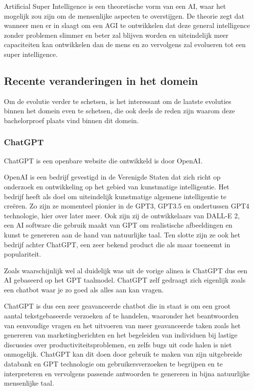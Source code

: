     Artificial Super Intelligence is een theoretische vorm van een AI, waar het mogelijk zou zijn om de mensenlijke aspecten te overstijgen. De theorie zegt dat wanneer men er in slaagt om een AGI te ontwikkelen dat deze general intelligence zonder problemen slimmer en beter zal blijven worden en uiteindelijk meer capaciteiten kan ontwikkelen dan de mens en zo vervolgens zal evolueren tot een super intelligence. 


\subsection{Recente veranderingen in het domein}

Om de evolutie verder te schetsen, is het interessant om de laatste evoluties binnen het domein even te schetsen, die ook deels de reden zijn waarom deze bachelorproef plaats vind binnen dit domein. 

\subsubsection{ChatGPT}
ChatGPT is een openbare website die ontwikkeld is door OpenAI.

OpenAI is een bedrijf gevestigd in de Verenigde Staten dat zich richt op onderzoek en ontwikkeling op het gebied van kunstmatige intelligentie. Het bedrijf heeft als doel om uiteindelijk kunstmatige algemene intelligentie te creëren. Zo zijn ze momenteel pionier in de GPT3, GPT3.5 en ondertussen GPT4 technologie, hier over later meer. Ook zijn zij de ontwikkelaars van DALL-E 2, een AI software die gebruik maakt van GPT om realistische afbeeldingen en kunst te genereren aan de hand van natuurlijke taal. Ten slotte zijn ze ook het bedrijf achter ChatGPT, een zeer bekend product die als maar toeneemt in populariteit.

Zoals waarschijnlijk wel al duidelijk was uit de vorige alinea is ChatGPT dus een AI gebaseerd op het GPT taalmodel. ChatGPT zelf gedraagt zich eigenlijk zoals een chatbot waar je zo goed als alles aan kan vragen.

ChatGPT is dus een zeer geavanceerde chatbot die in staat is om een groot aantal tekstgebaseerde verzoeken af te handelen, waaronder het beantwoorden van eenvoudige vragen en het uitvoeren van meer geavanceerde taken zoals het genereren van marketingberichten en het begeleiden van individuen bij lastige discussies over productiviteitsproblemen, en zelfs bugs uit code halen is niet onmogelijk. ChatGPT kan dit doen door gebruik te maken van zijn uitgebreide databank en GPT technologie om gebruikersverzoeken te begrijpen en te interpreteren en vervolgens passende antwoorden te genereren in bijna natuurlijke mensenlijke taal. 

